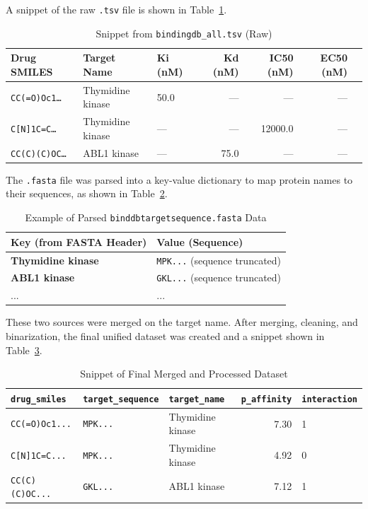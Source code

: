 A snippet of the raw \texttt{.tsv} file is shown in Table~\ref{tab:raw_csv}.
\begin{table}[H]
  \centering
  \caption{Snippet from \texttt{bindingdb\_all.tsv} (Raw)}
  \label{tab:raw_csv}
  \begin{tabular}{l l l r r r r}
    \toprule
    Drug SMILES & \textbf{Target Name} & Ki (nM) & Kd (nM) & IC50 (nM) & EC50 (nM) \\
    \midrule
    \texttt{CC(=O)Oc1\ldots} & Thymidine kinase & 50.0 & --- & --- & --- \\
    \texttt{C[N]1C=C\ldots} & Thymidine kinase & --- & --- & 12000.0 & --- \\
    \texttt{CC(C)(C)OC\ldots} & ABL1 kinase & --- & 75.0 & --- & --- \\
    \bottomrule
  \end{tabular}
\end{table}
The \texttt{.fasta} file was parsed into a key-value dictionary to map protein names to their sequences, as shown in Table~\ref{tab:fasta_parsed}.
\begin{table}[H]
  \centering
  \caption{Example of Parsed \texttt{binddbtargetsequence.fasta} Data}
  \label{tab:fasta_parsed}
  \begin{tabular}{l l}
    \toprule
    Key (from FASTA Header) & Value (Sequence) \\
    \midrule
    \textbf{Thymidine kinase} & \texttt{MPK...} (sequence truncated) \\
    \textbf{ABL1 kinase}      & \texttt{GKL...} (sequence truncated) \\
    ...                       & ... \\
    \bottomrule
  \end{tabular}
\end{table}
These two sources were merged on the target name.
After merging, cleaning, and binarization, the final unified dataset was created and a snippet shown in Table~\ref{tab:merged_data}.
\begin{table}[H]
  \centering
  \caption{Snippet of Final Merged and Processed Dataset}
  \label{tab:merged_data}
  \begin{tabular}{lllrl}
    \toprule
    \texttt{drug\_smiles} & \texttt{target\_sequence} & \texttt{target\_name} & \texttt{p\_affinity} & \texttt{interaction} \\
    \midrule
    \texttt{CC(=O)Oc1...} & \texttt{MPK...} & Thymidine kinase & 7.30 & 1 \\
    \texttt{C[N]1C=C...} & \texttt{MPK...} & Thymidine kinase & 4.92 & 0 \\
    \texttt{CC(C)(C)OC...} & \texttt{GKL...} & ABL1 kinase & 7.12 & 1 \\
    \bottomrule
  \end{tabular}
\end{table}

